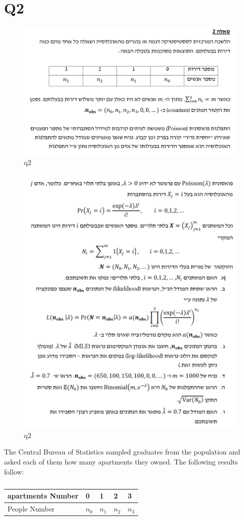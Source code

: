 \newpage

\section{Q2}


\begin{figure}[htbp]
    \centering
    \includegraphics[width=0.48\linewidth]{images/q21.png}
    \caption{q2}\label{fig:q21}
\end{figure}

\begin{figure}[htbp]
    \centering
    \includegraphics[width=0.48\linewidth]{images/q22.png}
    \caption{q2}\label{fig:q22}
\end{figure}


The Central Bureau of Statistics sampled graduates 
from the population and asked each of them how many
apartments they owned. The following results follow:

\begin{table}[htbp]
    \centering
    \begin{tabular}{|l|l|l|l|l|}
    \hline
    apartments Number & 0 & 1 & 2 & 3 \\ \hline
    People Number & $n_0$ & $n_1$ & $n_2$ & $n_3$ \\ \hline
    \end{tabular}
    \caption{}\label{table:example_2x5}
\end{table}

